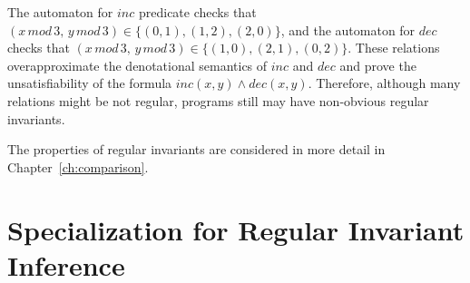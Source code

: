\begin{example}
The automaton for $inc$ predicate checks that $ (x \, \mathit{mod} \, 3, \, y \, \mathit{mod} \, 3) \in \{(0,1), (1, 2 ), (2,0) \} $, and the automaton for $ dec $ checks that $ (x \, \mathit{mod} \, 3, \, y \, \mathit{mod} \, 3) \in \{(1,0),(2,1),(0,2)\}$. These relations overapproximate the denotational semantics of $inc$ and $dec$ and prove the unsatisfiability of the formula $inc(x, y) \land dec(x, y)$.
Therefore, although many relations might be not regular, programs still may have non-obvious regular invariants.
\end{example}

The properties of regular invariants are considered in more detail in Chapter~\cref{ch:comparison}.

\section{Specialization for Regular Invariant Inference}\label{sec:fmf/specRegular}

\newworkflowWithTestersAndSelectors{}

